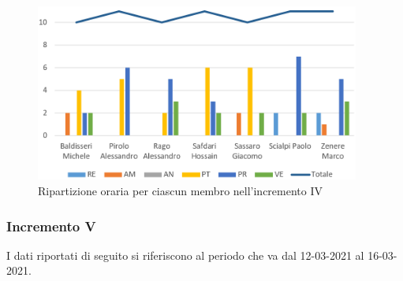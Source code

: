 \begin{figure}[!htb]   
    \centering
    \includegraphics[width=0.95\textwidth]{Images/prev4}
	\caption{Ripartizione oraria per ciascun membro nell'incremento IV}
\end{figure}

\subsubsection{Incremento V}

I dati riportati di seguito si riferiscono al periodo che va dal 12-03-2021 al 16-03-2021.

